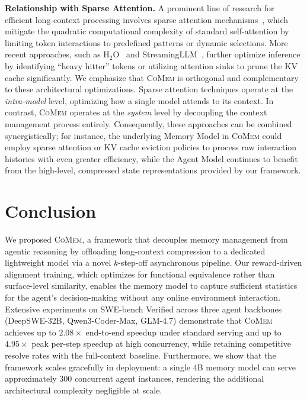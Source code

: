 \documentclass{article}
\theoremstyle{plain}
\theoremstyle{definition}
\theoremstyle{remark}
\newcommand{\model}{\textsc{CoMem}\xspace}
\begin{document}
\textbf{Relationship with Sparse Attention.} A prominent line of research for efficient long-context processing involves sparse attention mechanisms~\cite{child2019generating, beltagy2020longformer, zaheer2020big}, which mitigate the quadratic computational complexity of standard self-attention by limiting token interactions to predefined patterns or dynamic selections. More recent approaches, such as H$_2$O~\cite{zhang2023h2o} and StreamingLLM~\cite{xiao2023efficient}, further optimize inference by identifying ``heavy hitter'' tokens or utilizing attention sinks to prune the KV cache significantly. We emphasize that \textsc{CoMem} is orthogonal and complementary to these architectural optimizations. Sparse attention techniques operate at the \textit{intra-model} level, optimizing how a single model attends to its context. In contrast, \textsc{CoMem} operates at the \textit{system} level by decoupling the context management process entirely. Consequently, these approaches can be combined synergistically; for instance, the underlying Memory Model in \textsc{CoMem} could employ sparse attention or KV cache eviction policies to process raw interaction histories with even greater efficiency, while the Agent Model continues to benefit from the high-level, compressed state representations provided by our framework.

\section{Conclusion}
We proposed \model, a framework that decouples memory management from agentic reasoning by offloading long-context compression to a dedicated lightweight model via a novel $k$-step-off asynchronous pipeline. Our reward-driven alignment training, which optimizes for functional equivalence rather than surface-level similarity, enables the memory model to capture sufficient statistics for the agent's decision-making without any online environment interaction. Extensive experiments on SWE-bench Verified across three agent backbones (DeepSWE-32B, Qwen3-Coder-Max, GLM-4.7) demonstrate that \model achieves up to $2.08\times$ end-to-end speedup under standard serving and up to $4.95\times$ peak per-step speedup at high concurrency, while retaining competitive resolve rates with the full-context baseline. Furthermore, we show that the framework scales gracefully in deployment: a single 4B memory model can serve approximately 300 concurrent agent instances, rendering the additional architectural complexity negligible at scale.
\end{document}
